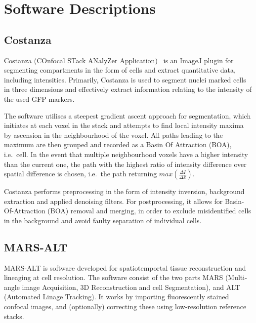 
\ifpdf
\graphicspath{{Appendix3/Figs/Raster/}{Appendix3/Figs/PDF/}{Appendix3/Figs/}}
\else
\graphicspath{{Appendix3/Figs/Vector/}{Appendix3/Figs/}}
\fi
\chapter{Software Descriptions}
\label{sec:software_descr}

\section{Costanza}
\label{sec:costanza}
Costanza (COnfocal STack ANalyZer Application)~\cite{costanza} is an ImageJ plugin for
segmenting compartments in the form of cells and extract quantitative data,
including intensities. Primarily, Costanza is used to segment nuclei marked
cells in three dimensions and effectively extract information relating to the
intensity of the used GFP markers.

The software utilises a steepest gradient ascent approach for segmentation, which
initiates at each voxel in the stack and attempts to find local intensity maxima
by ascension in the neighbourhood of the voxel. All paths leading to the maximum
are then grouped and recorded as a Basin Of Attraction (BOA), i.e.\ cell. In the event that
multiple neighbourhood voxels have a higher intensity than the current one, the
path with the highest ratio of intensity difference over spatial difference is
chosen, i.e.\ the path returning $max\left( \frac{\Delta I}{\Delta \bar x} \right)$.

Costanza performs preprocessing in the form
of intensity inversion, background extraction and applied denoising filters. 
For postprocessing, it allows for Basin-Of-Attraction (BOA) removal and merging, in
order to exclude misidentified cells in the background and avoid faulty
separation of individual cells. 


\section{MARS-ALT}
\label{sec:marsalt}
MARS-ALT is software developed for spatiotemportal tissue reconstruction and lineaging at cell
resolution. The software consist of the two parts MARS (Multi-angle image
Acquisition, 3D Reconstruction and cell Segmentation), and ALT (Automated Linage
Tracking). It works by importing fluorescently stained confocal images, and
(optionally) correcting these using low-resolution reference stacks. 

